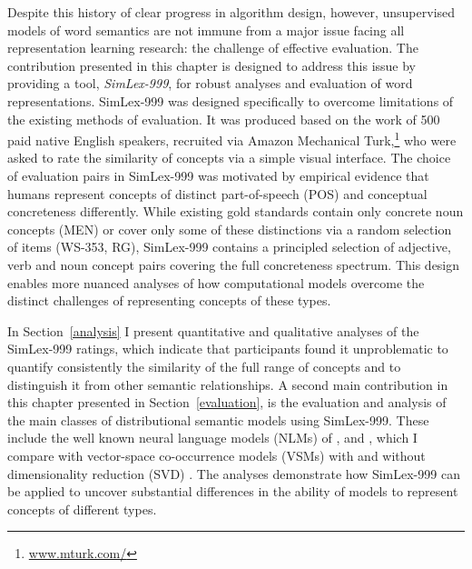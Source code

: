 Despite this history of clear progress in algorithm design, however, unsupervised models of word semantics are not immune from a major issue facing all representation learning research: the challenge of effective evaluation. 
The contribution presented in this chapter is designed to address this issue by providing a tool, \emph{SimLex-999}, for robust analyses and evaluation of word representations. SimLex-999 was designed specifically to overcome limitations of the existing methods of evaluation. It was produced based on the work of 500 paid native English speakers, recruited via Amazon Mechanical Turk,\footnote{\url{www.mturk.com/}} who were asked to rate the similarity of concepts via a simple visual interface. The choice of evaluation pairs in SimLex-999 was motivated by empirical evidence that humans represent concepts of distinct part-of-speech (POS) \cite{gentner1978relational} and conceptual concreteness \cite{hill2013quantitative} differently. While existing gold standards contain only concrete noun concepts (MEN) or cover only some of these distinctions via a random selection of items (WS-353, RG), SimLex-999 contains a principled selection of adjective, verb and noun concept pairs covering the full concreteness spectrum. This design enables more nuanced analyses of how computational models overcome the distinct challenges of representing concepts of these types. 

In Section~\ref{analysis} I present quantitative and qualitative analyses of the SimLex-999 ratings, which indicate that participants found it unproblematic to quantify consistently the similarity of the full range of concepts and to distinguish it from other semantic relationships. A second main contribution in this chapter presented in Section~\ref{evaluation}, is the evaluation and analysis of the main classes of distributional semantic models using SimLex-999. These include the well known neural language models (NLMs) of \cite{huang2012improving}, \cite{collobert2008unified} and \cite{mikolov2013efficient}, which I compare with vector-space co-occurrence models (VSMs) \cite{turney2010frequency} with and without dimensionality reduction (SVD) \cite{landauer1997solution}. The analyses demonstrate how SimLex-999 can be applied to uncover substantial differences in the ability of models to represent concepts of different types. 

